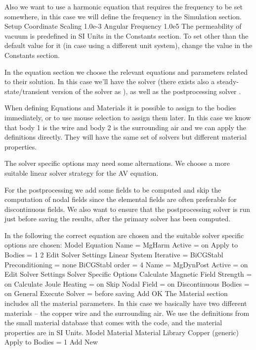 Also we want to use a harmonic equation that requires the frequency to be set somewhere, in this case we will define the frequency in the Simulation section. 
\ttbegin
Setup
  Coordinate Scaling 
    1.0e-3
  Angular Frequency
    1.0e5   
\ttend
The permeability of vacuum is predefined in SI Units in the Constants section. To set other than the default value for it (in case using a different unit system),
change the value in the Constants section.

In the equation section we choose the relevant equations and parameters related to their solution. 
In this case we'll have the \texttt{} solver (there exists also a steady-state/transient version of the solver
as \texttt{}), as well as the postprocessing solver \texttt{}.

When defining Equations and Materials it is possible to assign to the bodies immediately, or to use mouse
selection to assign them later. In this case we know that body 1 is the wire and body 2 is the surrounding air and we
can apply the definitions directly.
They will have the same set of solvers but different material properties. 

The solver specific options may need some alternations. We choose a more suitable
linear solver strategy for the AV equation. 

For the postprocessing we add some fields to be computed and skip the computation of nodal fields since the
elemental fields are often preferable for discontinuous fields. 
We also want to ensure that the postprocessing solver is run just before saving the results, after the primary solver has been computed.

In the following the correct equation are chosen and the suitable solver specific options are chosen:
\ttbegin
Model
  Equation
    Name = MgHarm
      Active = on
      Apply to Bodies = 1 2  
      Edit Solver Settings
        Linear System
          Iterative = BiCGStabl
        Preconditioning = none
        BiCGStabl order = 4    
    Name = MgDynPost
      Active = on
      Edit Solver Settings
        Solver Specific Options
          Calculate Magnetic Field Strength = on
          Calculate Joule Heating = on
          Skip Nodal Field = on
          Discontinuous Bodies = on
        General
          Execute Solver = before saving   
    Add 
    OK
\ttend        
The Material section includes all the material parameters. In this case we basically have two 
different materials -- the copper wire and the surrounding air.
We use the definitions from the small material database that comes with the code, and the material properties are in SI Units.
\ttbegin
Model
  Material
    Material Library
      Copper (generic)
    Apply to Bodies = 1
    Add
    New


